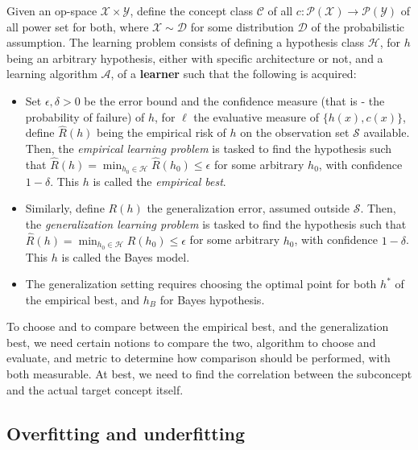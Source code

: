 \begin{setting}
    Given an op-space $\mathcal{X}\times\mathcal{Y}$, define the concept class $\mathcal{C}$ of all $c: \mathcal{P}(\mathcal{X})\to \mathcal{P}(\mathcal{Y})$ of all power set for both, where $\mathcal{X}\sim \mathcal{D}$ for some distribution $\mathcal{D}$ of the probabilistic assumption. The learning problem consists of defining a hypothesis class $\mathcal{H}$, for $h$ being an arbitrary hypothesis, either with specific architecture or not, and a learning algorithm $\mathcal{A}$, of a \textbf{learner} such that the following is acquired: 
    \begin{itemize}[itemsep=1pt,topsep=1pt]
        \item Set $\epsilon,\delta> 0$ be the error bound and the confidence measure (that is - the probability of failure) of $h$, for $\ell$ the evaluative measure of $\{h(x),c(x)\}$, define $\hat{R}(h)$ being the empirical risk of $h$ on the observation set $\mathcal{S}$ available. Then, the \textit{empirical learning problem} is tasked to find the hypothesis such that $\hat{R}(h) = \min_{h_{0}\in \mathcal{H}}\hat{R}(h_{0})\leq \epsilon$ for some arbitrary $h_{0}$, with confidence $1-\delta$. This $h$ is called the \textit{empirical best}. 
        \item Similarly, define $R(h)$ the generalization error, assumed outside $\mathcal{S}$. Then, the \textit{generalization learning problem} is tasked to find the hypothesis such that $\hat{R}(h) = \min_{h_{0}\in \mathcal{H}}R(h_{0})\leq \epsilon$ for some arbitrary $h_{0}$, with confidence $1-\delta$. This $h$ is called the Bayes model. 
        \item The generalization setting requires choosing the optimal point for both $h^{*}$ of the empirical best, and $h_{B}$ for Bayes hypothesis. 
    \end{itemize} 
\end{setting}
To choose and to compare between the empirical best, and the generalization best, we need certain notions to compare the two, algorithm to choose and evaluate, and metric to determine how comparison should be performed, with both measurable. At best, we need to find the correlation between the subconcept and the actual target concept itself. 

\subsection{Overfitting and underfitting}

